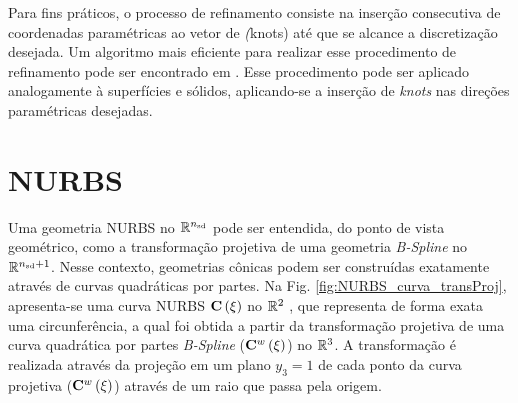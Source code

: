 \documentclass[tese_patricia]{subfiles}
\begin{document}
Para fins práticos, o processo de refinamento consiste na inserção consecutiva de coordenadas paramétricas ao vetor de \textit(knots) até que se alcance a discretização desejada. Um algoritmo mais eficiente para realizar esse procedimento de refinamento pode ser encontrado em . Esse procedimento pode ser aplicado analogamente à superfícies e sólidos, aplicando-se a inserção de \textit{knots} nas direções paramétricas desejadas.


\section{NURBS}

Uma geometria NURBS no $\mathbb{R}^{{n_{\mathrm{sd}}}}$ pode ser entendida, do ponto de vista geométrico, como a transformação projetiva de uma geometria \textit{B-Spline} no $\mathbb{R}^{{n_{\mathrm{sd}}}+1}$. Nesse contexto, geometrias cônicas podem ser construídas exatamente através de curvas quadráticas por partes. Na Fig. \ref{fig:NURBS_curva_transProj}, apresenta-se uma curva NURBS $\mathbf{C}\left(\xi\right)$ no $\mathbb{R}^{2}$ , que representa de forma exata uma circunferência, a qual foi obtida a partir da transformação projetiva de uma curva quadrática por partes \textit{B-Spline} ($\mathbf{C}^{w}\left(\xi\right)$) no  $\mathbb{R}^{3}$. A transformação é realizada através da projeção em um plano $y_3 = 1$ de cada ponto da curva projetiva ($\mathbf{C}^{w}\left(\xi\right)$) através de um raio que passa pela origem.
\end{document}
